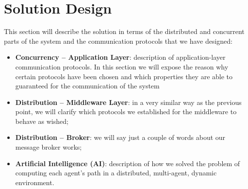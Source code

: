 \section{Solution Design}

This section will describe the solution in terms of the distributed and
concurrent parts of the system and the communication protocols that we have
designed:

\begin{itemize}
\item \textbf{Concurrency -- Application Layer}:
  description of application-layer communication protocols. In this section we
  will expose the reason why certain protocols have been chosen and which
  properties they are able to guaranteed for the communication of the system
\item \textbf{Distribution -- Middleware Layer}:
  in a very similar way as the previous point, we will clarify which protocols
  we established for the middleware to behave as wished;
\item \textbf{Distribution -- Broker}:
  we will say just a couple of words about our message broker works;
\item \textbf{Artificial Intelligence (AI)}:
  description of how we solved the problem of computing each agent's path
  in a distributed, multi-agent, dynamic environment.
\end{itemize}







